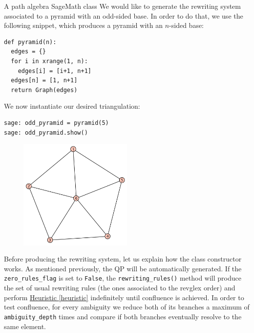 \begin{chapter}{A path algebra SageMath class}
We would like to generate the rewriting system associated to a pyramid with an odd-sided base. In order to do that, we use the following snippet, which produces a pyramid with an $n$-sided base:
\begin{lstlisting}
def pyramid(n):
  edges = {}
  for i in xrange(1, n):
    edges[i] = [i+1, n+1]
  edges[n] = [1, n+1]
  return Graph(edges)
\end{lstlisting}
We now instantiate our desired triangulation:
\begin{lstlisting}
sage: odd_pyramid = pyramid(5)
sage: odd_pyramid.show()
\end{lstlisting}
\begin{figure}[h]
\centering
\includegraphics[width=0.5\textwidth]{odd_pyramid.png}
\end{figure}
Before producing the rewriting system, let us explain how the class constructor works. As mentioned previously, the QP will be automatically generated. If the \texttt{zero\_rules\_flag} is set to \texttt{False}, the \texttt{rewriting\_rules()} method will produce the set of usual rewriting rules (the ones associated to the revglex order) and perform \hyperref[heuristic]{Heuristic \ref*{heuristic}} indefinitely until confluence is achieved. In order to test confluence, for every ambiguity we reduce both of its branches a maximum of \texttt{ambiguity\_depth} times and compare if both branches eventually resolve to the same element.


\end{chapter}
